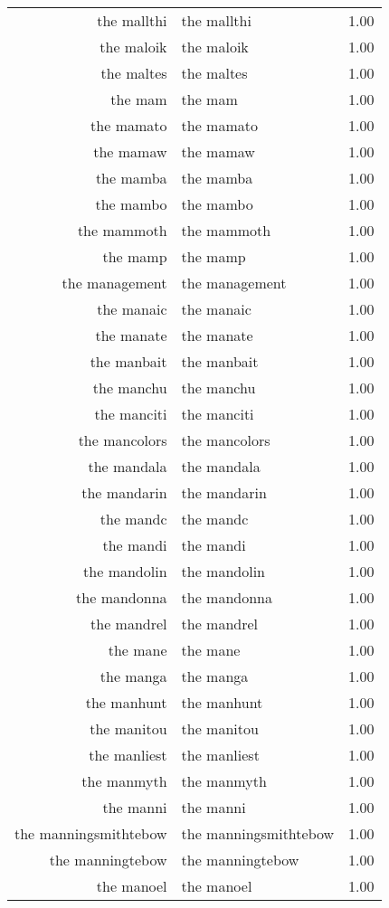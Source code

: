 \begin{table}[ht]
\begin{tabular}{rlr}
  the mallthi & the mallthi & 1.00 \\ 
  the maloik & the maloik & 1.00 \\ 
  the maltes & the maltes & 1.00 \\ 
  the mam & the mam & 1.00 \\ 
  the mamato & the mamato & 1.00 \\ 
  the mamaw & the mamaw & 1.00 \\ 
  the mamba & the mamba & 1.00 \\ 
  the mambo & the mambo & 1.00 \\ 
  the mammoth & the mammoth & 1.00 \\ 
  the mamp & the mamp & 1.00 \\ 
  the management & the management & 1.00 \\ 
  the manaic & the manaic & 1.00 \\ 
  the manate & the manate & 1.00 \\ 
  the manbait & the manbait & 1.00 \\ 
  the manchu & the manchu & 1.00 \\ 
  the manciti & the manciti & 1.00 \\ 
  the mancolors & the mancolors & 1.00 \\ 
  the mandala & the mandala & 1.00 \\ 
  the mandarin & the mandarin & 1.00 \\ 
  the mandc & the mandc & 1.00 \\ 
  the mandi & the mandi & 1.00 \\ 
  the mandolin & the mandolin & 1.00 \\ 
  the mandonna & the mandonna & 1.00 \\ 
  the mandrel & the mandrel & 1.00 \\ 
  the mane & the mane & 1.00 \\ 
  the manga & the manga & 1.00 \\ 
  the manhunt & the manhunt & 1.00 \\ 
  the manitou & the manitou & 1.00 \\ 
  the manliest & the manliest & 1.00 \\ 
  the manmyth & the manmyth & 1.00 \\ 
  the manni & the manni & 1.00 \\ 
  the manningsmithtebow & the manningsmithtebow & 1.00 \\ 
  the manningtebow & the manningtebow & 1.00 \\ 
  the manoel & the manoel & 1.00 \\ 

\end{tabular}
\end{table}
